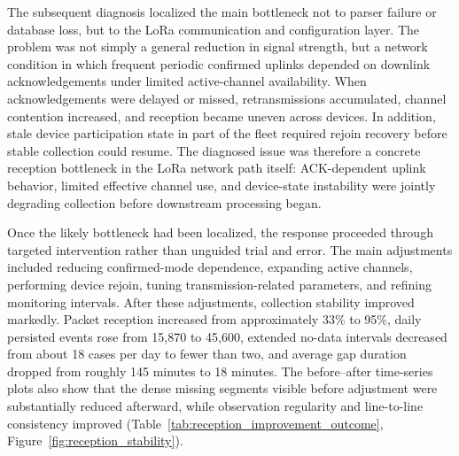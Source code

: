 \documentclass[systems,article,submit,pdftex,moreauthors]{Definitions/mdpi}
\begin{document}
The subsequent diagnosis localized the main bottleneck not to parser failure or database loss, but to the LoRa communication and configuration layer. The problem was not simply a general reduction in signal strength, but a network condition in which frequent periodic confirmed uplinks depended on downlink acknowledgements under limited active-channel availability. When acknowledgements were delayed or missed, retransmissions accumulated, channel contention increased, and reception became uneven across devices. In addition, stale device participation state in part of the fleet required rejoin recovery before stable collection could resume. The diagnosed issue was therefore a concrete reception bottleneck in the LoRa network path itself: ACK-dependent uplink behavior, limited effective channel use, and device-state instability were jointly degrading collection before downstream processing began.

Once the likely bottleneck had been localized, the response proceeded through targeted intervention rather than unguided trial and error. The main adjustments included reducing confirmed-mode dependence, expanding active channels, performing device rejoin, tuning transmission-related parameters, and refining monitoring intervals. After these adjustments, collection stability improved markedly. Packet reception increased from approximately 33\% to 95\%, daily persisted events rose from 15{,}870 to 45{,}600, extended no-data intervals decreased from about 18 cases per day to fewer than two, and average gap duration dropped from roughly 145 minutes to 18 minutes. The before--after time-series plots also show that the dense missing segments visible before adjustment were substantially reduced afterward, while observation regularity and line-to-line consistency improved (Table~\ref{tab:reception_improvement_outcome}, Figure~\ref{fig:reception_stability}).
\end{document}
